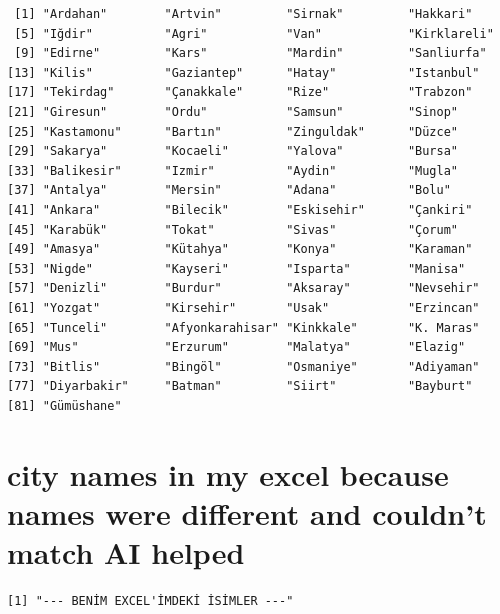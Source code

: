 \documentclass[
  11pt,
  a4paper,
  DIV=11,
  numbers=noendperiod]{scrartcl}
\newenvironment{Shaded}{\begin{snugshade}}{\end{snugshade}}
\newcommand{\FunctionTok}[1]{\textcolor[rgb]{0.28,0.35,0.67}{#1}}
\newcommand{\NormalTok}[1]{\textcolor[rgb]{0.00,0.23,0.31}{#1}}
\newcommand{\OtherTok}[1]{\textcolor[rgb]{0.00,0.23,0.31}{#1}}
\newcommand{\SpecialCharTok}[1]{\textcolor[rgb]{0.37,0.37,0.37}{#1}}
\newcommand{\StringTok}[1]{\textcolor[rgb]{0.13,0.47,0.30}{#1}}
\begin{document}
\begin{verbatim}
 [1] "Ardahan"        "Artvin"         "Sirnak"         "Hakkari"       
 [5] "Iğdir"          "Agri"           "Van"            "Kirklareli"    
 [9] "Edirne"         "Kars"           "Mardin"         "Sanliurfa"     
[13] "Kilis"          "Gaziantep"      "Hatay"          "Istanbul"      
[17] "Tekirdag"       "Çanakkale"      "Rize"           "Trabzon"       
[21] "Giresun"        "Ordu"           "Samsun"         "Sinop"         
[25] "Kastamonu"      "Bartın"         "Zinguldak"      "Düzce"         
[29] "Sakarya"        "Kocaeli"        "Yalova"         "Bursa"         
[33] "Balikesir"      "Izmir"          "Aydin"          "Mugla"         
[37] "Antalya"        "Mersin"         "Adana"          "Bolu"          
[41] "Ankara"         "Bilecik"        "Eskisehir"      "Çankiri"       
[45] "Karabük"        "Tokat"          "Sivas"          "Çorum"         
[49] "Amasya"         "Kütahya"        "Konya"          "Karaman"       
[53] "Nigde"          "Kayseri"        "Isparta"        "Manisa"        
[57] "Denizli"        "Burdur"         "Aksaray"        "Nevsehir"      
[61] "Yozgat"         "Kirsehir"       "Usak"           "Erzincan"      
[65] "Tunceli"        "Afyonkarahisar" "Kinkkale"       "K. Maras"      
[69] "Mus"            "Erzurum"        "Malatya"        "Elazig"        
[73] "Bitlis"         "Bingöl"         "Osmaniye"       "Adiyaman"      
[77] "Diyarbakir"     "Batman"         "Siirt"          "Bayburt"       
[81] "Gümüshane"     
\end{verbatim}

\section{city names in my excel because names were different and
couldn't match AI
helped}\label{city-names-in-my-excel-because-names-were-different-and-couldnt-match-ai-helped}

\begin{Shaded}
\end{Shaded}

\begin{verbatim}
[1] "--- BENİM EXCEL'İMDEKİ İSİMLER ---"
\end{verbatim}
\end{document}
